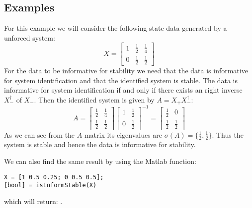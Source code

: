 \subsection{Examples}
For this example we will consider the following state data generated by a unforced system:
\[ X = \begin{bmatrix}
1 & \frac{1}{2} & \frac{1}{4} \\ 0 & \frac{1}{2} & \frac{1}{2}
\end{bmatrix} \]
For the data to be informative for stability we need that the data is informative for system identification and that the identified system is stable. The data is informative for system identification if and only if there exists an right inverse $X_-^\dagger$ of $X_-$. Then the identified system is given by $A = X_+ X_-^\dagger$:
\[ A = \begin{bmatrix}
\frac{1}{2} & \frac{1}{4} \\ \frac{1}{2} & \frac{1}{2}
\end{bmatrix} \begin{bmatrix}
1 & \frac{1}{2} \\ 0 & \frac{1}{2}
\end{bmatrix}^{-1} = \begin{bmatrix} \frac{1}{2} & 0 \\ \frac{1}{2} & \frac{1}{2} \end{bmatrix} \]
As we can see from the $A$ matrix its eigenvalues are $\sigma(A) = \{\frac{1}{2}, \frac{1}{2}\}$. Thus the system is stable and hence the data is informative for stability.

We can also find the same result by using the Matlab function:
\begin{lstlisting}
X = [1 0.5 0.25; 0 0.5 0.5];
[bool] = isInformStable(X)
\end{lstlisting}
which will return: \mon{[ 1 ]}.